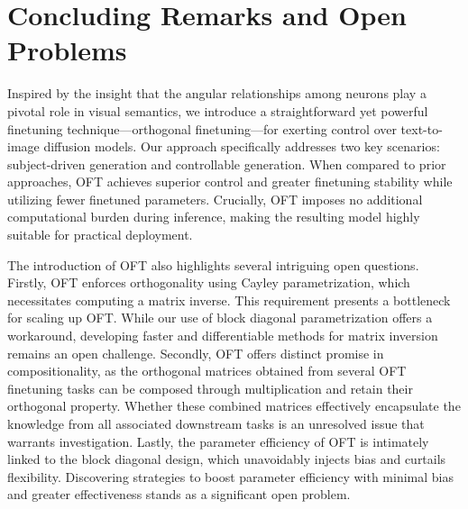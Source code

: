 \section{Concluding Remarks and Open Problems}

Inspired by the insight that the angular relationships among neurons play a pivotal role in visual semantics, we introduce a straightforward yet powerful finetuning technique—orthogonal finetuning—for exerting control over text-to-image diffusion models. Our approach specifically addresses two key scenarios: subject-driven generation and controllable generation. When compared to prior approaches, OFT achieves superior control and greater finetuning stability while utilizing fewer finetuned parameters. Crucially, OFT imposes no additional computational burden during inference, making the resulting model highly suitable for practical deployment.

The introduction of OFT also highlights several intriguing open questions. Firstly, OFT enforces orthogonality using Cayley parametrization, which necessitates computing a matrix inverse. This requirement presents a bottleneck for scaling up OFT. While our use of block diagonal parametrization offers a workaround, developing faster and differentiable methods for matrix inversion remains an open challenge. Secondly, OFT offers distinct promise in compositionality, as the orthogonal matrices obtained from several OFT finetuning tasks can be composed through multiplication and retain their orthogonal property. Whether these combined matrices effectively encapsulate the knowledge from all associated downstream tasks is an unresolved issue that warrants investigation. Lastly, the parameter efficiency of OFT is intimately linked to the block diagonal design, which unavoidably injects bias and curtails flexibility. Discovering strategies to boost parameter efficiency with minimal bias and greater effectiveness stands as a significant open problem.